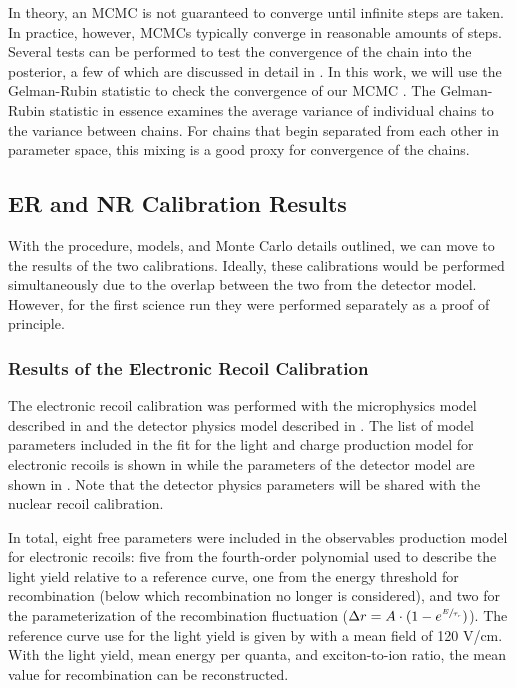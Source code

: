 In theory, an MCMC is not guaranteed to converge until infinite steps are taken.  In practice, however, MCMCs typically converge in reasonable amounts of steps.  Several tests can be performed to test the convergence of the chain into the posterior, a few of which are discussed in detail in .  In this work, we will use the Gelman-Rubin statistic to check the convergence of our MCMC \cite{gelman1992inference}.  The Gelman-Rubin statistic in essence examines the average variance of individual chains to the variance between chains.  For chains that begin separated from each other in parameter space, this mixing is a good proxy for convergence of the chains.




\subsection{ER and NR Calibration Results}
\label{sec:xe1t_er_nr_results}

With the procedure, models, and Monte Carlo details outlined, we can move to the results of the two calibrations.  Ideally, these calibrations would be performed simultaneously due to the overlap between the two from the detector model.  However, for the first science run they were performed separately as a proof of principle.


\subsubsection{Results of the Electronic Recoil Calibration}
\label{sec:xe1t_er_cal_results}

The electronic recoil calibration was performed with the microphysics model described in  and the detector physics model described in .  The list of model parameters included in the fit for the light and charge production model for electronic recoils is shown in  while the parameters of the detector model are shown in .  Note that the detector physics parameters will be shared with the nuclear recoil calibration.

In total, eight free parameters were included in the observables production model for electronic recoils: five from the fourth-order polynomial used to describe the light yield relative to a reference curve, one from the energy threshold for recombination (below which recombination no longer is considered), and two for the parameterization of the recombination fluctuation ($\Delta r = A \cdot (1 - e^{\sfrac{E}{\tau_r}})$).  The reference curve use for the light yield is given by  with a mean field of 120 V/cm.  With the light yield, mean energy per quanta, and exciton-to-ion ratio, the mean value for recombination can be reconstructed.  



